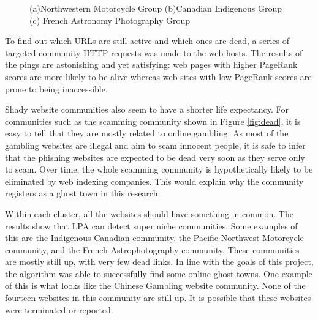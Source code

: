\documentclass[conference]{IEEEtran}
\begin{document}
\begin{figure}
    \centering
    \caption{(a)Northwestern Motorcycle Group (b)Canadian Indigenous Group (c) French Astronomy Photography Group}
    \label{fig:small groups}
\end{figure}

To find out which URLs are still active and which ones are dead, a series of targeted community HTTP requests was made to the web hosts. The results of the pings are astonishing and yet satisfying: web pages with higher PageRank scores\cite{ilprints422} are more likely to be alive whereas web sites with low PageRank scores are prone to being inaccessible.

Shady website communities also seem to have a shorter life expectancy. For communities such as the scamming community shown in Figure \ref{fig:dead}, it is easy to tell that they are mostly related to online gambling. As most of the gambling websites are illegal and aim to scam innocent people, it is safe to infer that the phishing websites are expected to be dead very soon as they serve only to scam. Over time, the whole scamming community is hypothetically likely to be eliminated by web indexing companies. This would explain why the community registers as a ghost town in this research.

Within each cluster, all the websites should have something in common. The results show that LPA can detect super niche communities. Some examples of this are the Indigenous Canadian community, the Pacific-Northwest Motorcycle community, and the French Astrophotography community. These communities are mostly still up, with very few dead links. In line with the goals of this project, the algorithm was able to successfully find some online ghost towns. One example of this is what looks like the Chinese Gambling website community. None of the fourteen websites in this community are still up. It is possible that these websites were terminated or reported.
\end{document}
